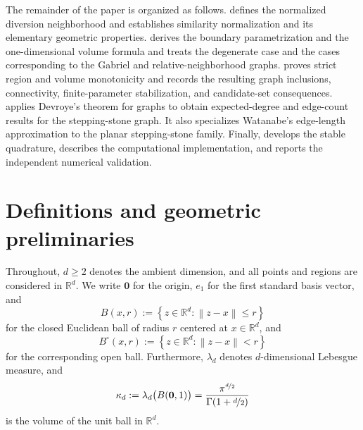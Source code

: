 \documentclass[a4paper,fleqn]{cas-dc}
\theoremstyle{definition}
\theoremstyle{remark}
\newcommand{\R}{\mathds{R}}
\newcommand{\norm}[1]{\left\lVert #1\right\rVert}
\newcommand{\set}[1]{\left\{#1\right\}}
\newcommand{\0}{\mathbf{0}}
\newcommand{\tb}[1]{\textcolor[HTML]{0000bb}{#1}}
\begin{document}
The remainder of the paper is organized as follows.
 defines the normalized diversion neighborhood and
establishes similarity normalization and its elementary geometric
properties.
 derives the boundary parametrization and the
one-dimensional volume formula and treats the degenerate case and the cases corresponding to the Gabriel and relative-neighborhood graphs.
 proves strict region and volume monotonicity
and records the resulting graph inclusions, connectivity,
finite-parameter stabilization, and candidate-set consequences.
 applies Devroye's
theorem for graphs to obtain expected-degree and edge-count
results for the stepping-stone graph. It also specializes Watanabe's
edge-length approximation to the planar stepping-stone family.
Finally,  develops the stable quadrature, describes the
computational implementation, and reports the independent numerical validation.


\section{Definitions and geometric preliminaries}
\label{sec:geometry}

Throughout, $d\geq2$ denotes the ambient dimension, and all points and
regions are considered in $\R^d$. 
We write $\0$ for the origin, $e_1$ for the first standard basis vector,
and
\begin{equation}
    B(x,r)
    :=
    \set{z\in\R^d:\norm{z-x}\leq r}
\end{equation}
for the closed Euclidean ball of radius $r$ centered at $x\in\R^d$, and
\begin{equation}
    B^\circ(x,r)
    :=
    \set{z\in\R^d:\norm{z-x}<r}
\end{equation}
for the corresponding open ball.
Furthermore, $\lambda_d$ denotes $d$-dimensional Lebesgue measure, and
\begin{equation}
    \kappa_d
    :=
    \lambda_d\bigl(B(\0,1)\bigr)
    =
    \frac{\pi^{\nicefrac{d}{2}}}{\Gamma(1+\nicefrac{d}{2})}
\end{equation}
is the volume of the unit ball in $\R^d$.
\end{document}
